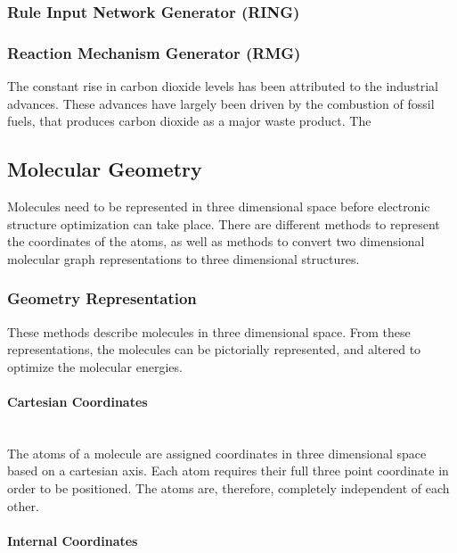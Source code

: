 \documentclass[12pt]{article}
\begin{document}
\subsubsection{Rule Input Network Generator (RING)}
\subsubsection{Reaction Mechanism Generator (RMG)}

The constant rise in carbon dioxide levels has been attributed to the industrial advances. These advances have largely been driven by the combustion of fossil fuels, that produces carbon dioxide as a major waste product. The 

\subsection{Molecular Geometry}

Molecules need to be represented in three dimensional space before electronic structure optimization can take place. There are different methods to represent the coordinates of the atoms, as well as methods to convert two dimensional molecular graph representations to three dimensional structures.

\subsubsection{Geometry Representation}

These methods describe molecules in three dimensional space. From these representations, the molecules can be pictorially represented, and altered to optimize the molecular energies.

\paragraph{Cartesian Coordinates}\mbox{}\\

The atoms of a molecule are assigned coordinates in three dimensional space based on a cartesian axis. Each atom requires their full three point coordinate in order to be positioned. The atoms are, therefore, completely independent of each other.

\paragraph{Internal Coordinates}\mbox{}\\
\end{document}
